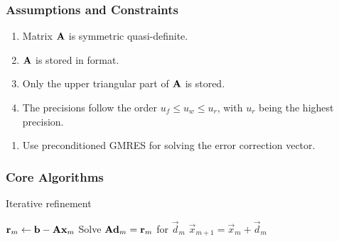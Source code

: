 \documentclass[t,12pt,numbers,fleqn]{beamer}
\begin{document}

\begin{frame}
\frametitle{Assumptions and Constraints}

\begin{enumerate}[{A}1]
\item Matrix \(\mathbf{A}\) is symmetric quasi-definite.
\item \(\mathbf{A}\) is stored in \cite{noauthor_compressed_nodate} format.
\item Only the upper triangular part of \(\mathbf{A}\) is stored.
\item The precisions follow the order \(u_f \leq u_w \leq u_r\), with \(u_r\) being the
  highest precision.
\end{enumerate}

\begin{enumerate}[{C}1]
\item Use preconditioned GMRES for solving the error correction vector.
\end{enumerate}

\end{frame}


\begin{frame}
\frametitle{Core Algorithms}

  \begin{algorithm}[H]
    \caption{Iterative refinement}
    \begin{algorithmic}[1]
      \State \(\mathbf{r}_m \gets \mathbf{b} - \mathbf{A}\mathbf{x}_m\) \label{algo:ir:residual}
      \State Solve \(\mathbf{A}\mathbf{d}_m = \mathbf{r}_m\) for \(\vec{d}_m\) \label{algo:ir:solve}
      \State \(\vec{x}_{m + 1} = \vec{x}_m + \vec{d}_m\) 
      \EndFor
    \end{algorithmic}
  \end{algorithm}
\end{frame}

\end{document}
